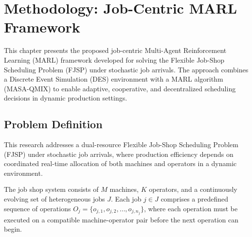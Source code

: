 \chapter{Methodology: Job-Centric MARL Framework}
\label{chap:methodology}

This chapter presents the proposed job-centric Multi-Agent Reinforcement Learning (MARL) framework developed for solving the Flexible Job-Shop Scheduling Problem (FJSP) under stochastic job arrivals.
The approach combines a Discrete Event Simulation (DES) environment with a MARL algorithm (MASA-QMIX) to enable adaptive, cooperative, and decentralized scheduling decisions in dynamic production settings.

\section{Problem Definition}
\label{sec:problemdefinition}
This research addresses a dual-resource Flexible Job-Shop Scheduling Problem (FJSP) under stochastic job arrivals, where production efficiency depends on coordinated real-time allocation of both machines and operators in a dynamic environment.

The job shop system consists of \( M \) machines, \( K \) operators, and a continuously evolving set of heterogeneous jobs \( J \). Each job \( j \in J \) comprises a predefined sequence of operations \( O_j = \{o_{j,1}, o_{j,2}, \ldots, o_{j,n_j}\} \), where each operation must be executed on a compatible machine-operator pair before the next operation can begin.

